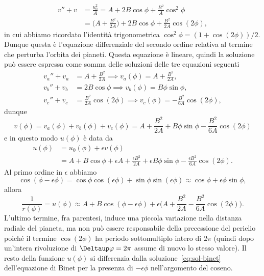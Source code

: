 \begin{equation}
  \begin{split}
    v'' + v &= \frac{u_{0}^{2}}{A} = A + 2B\cos\phi +
    \frac{B^{2}}{A}\cos^{2}\phi \\
    &= \bigg(A + \frac{B^{2}}{2A}\bigg) + 2B\cos\phi +
    \frac{B^{2}}{2A}\cos(2\phi),
\end{split}
\end{equation}
in cui abbiamo ricordato l'identità trigonometrica
$\cos^{2}\phi = (1 + \cos(2\phi))/2$.  Dunque questa è l'equazione differenziale
del secondo ordine relativa al termine che perturba l'orbita dei pianeti.
Questa equazione è lineare, quindi la soluzione può essere espressa come somma
delle soluzioni delle tre equazioni seguenti
\begin{subequations}
  \begin{align}
    v_{a}'' + v_{a} &= A + \frac{B^{2}}{2A} \implies v_{a}(\phi) = A +
    \frac{B^{2}}{2A}, \\
    v_{b}'' + v_{b} &= 2B\cos\phi \implies v_{b}(\phi) = B\phi \sin\phi, \\
    v_{c}'' + v_{c} &= \frac{B^{2}}{2A}\cos(2\phi) \implies v_{c}(\phi) =
    -\frac{B^{2}}{6A}\cos(2\phi),
  \end{align}
\end{subequations}
dunque
\begin{equation}
  v(\phi) = v_{a}(\phi) + v_{b}(\phi) + v_{c}(\phi) = A + \frac{B^{2}}{2A} +
  B\phi\sin\phi - \frac{B^{2}}{6A}\cos(2\phi)
\end{equation}
e in questo modo $u(\phi)$ è data da
\begin{equation}
  \begin{split}
    u(\phi) &= u_{0}(\phi) + \epsilon v(\phi) \\
    &= A + B\cos\phi + \epsilon A + \frac{\epsilon B^{2}}{2A} + \epsilon
    B\phi\sin\phi - \frac{\epsilon B^{2}}{6A}\cos(2\phi).
  \end{split}
\end{equation}
Al primo ordine in $\epsilon$ abbiamo
\begin{equation}
  \cos(\phi - \epsilon\phi) = \cos\phi \cos(\epsilon\phi) + \sin\phi
  \sin(\epsilon\phi) \approx \cos\phi + \epsilon\phi\sin\phi,
\end{equation}
allora
\begin{equation}
  \frac{1}{r(\phi)} = u(\phi) \approx A + B\cos(\phi - \epsilon\phi) +
  \epsilon\bigg(A + \frac{B^{2}}{2A} - \frac{B^{2}}{6A}\cos(2\phi)\bigg).
\end{equation}
L'ultimo termine, fra parentesi, induce una piccola variazione nella distanza
radiale del pianeta, ma non può essere responsabile della precessione del
perielio poiché il termine $\cos(2\phi)$ ha periodo sottomultiplo intero di
$2\pi$ (quindi dopo un'intera rivoluzione di $\var \phi = 2\pi$ assume di nuovo
lo stesso valore).  Il resto della funzione $u(\phi)$ si differenzia dalla
soluzione~\eqref{eq:sol-binet} dell'equazione di Binet per la presenza di
$-\epsilon\phi$ nell'argomento del coseno.

